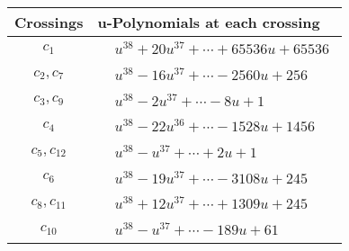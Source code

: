 \documentclass[1p]{elsarticle_modified}
\theoremstyle{definition}
\begin{document}
\begin{tabular}{m{50pt}|m{274pt}}
Crossings & \hspace{64pt}u-Polynomials at each crossing \\
\hline $$\begin{aligned}c_{1}\end{aligned}$$&$\begin{aligned}
&u^{38}+20 u^{37}+\cdots+65536 u+65536
\end{aligned}$\\
\hline $$\begin{aligned}c_{2},c_{7}\end{aligned}$$&$\begin{aligned}
&u^{38}-16 u^{37}+\cdots-2560 u+256
\end{aligned}$\\
\hline $$\begin{aligned}c_{3},c_{9}\end{aligned}$$&$\begin{aligned}
&u^{38}-2 u^{37}+\cdots-8 u+1
\end{aligned}$\\
\hline $$\begin{aligned}c_{4}\end{aligned}$$&$\begin{aligned}
&u^{38}-22 u^{36}+\cdots-1528 u+1456
\end{aligned}$\\
\hline $$\begin{aligned}c_{5},c_{12}\end{aligned}$$&$\begin{aligned}
&u^{38}- u^{37}+\cdots+2 u+1
\end{aligned}$\\
\hline $$\begin{aligned}c_{6}\end{aligned}$$&$\begin{aligned}
&u^{38}-19 u^{37}+\cdots-3108 u+245
\end{aligned}$\\
\hline $$\begin{aligned}c_{8},c_{11}\end{aligned}$$&$\begin{aligned}
&u^{38}+12 u^{37}+\cdots+1309 u+245
\end{aligned}$\\
\hline $$\begin{aligned}c_{10}\end{aligned}$$&$\begin{aligned}
&u^{38}- u^{37}+\cdots-189 u+61
\end{aligned}$\\
\hline
\end{tabular}\\~\\
\end{document}
